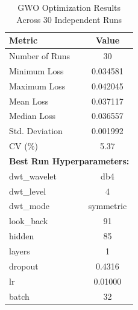 \begin{table}[htbp]
\centering
\caption{GWO Optimization Results Across 30 Independent Runs}
\label{tab:gwo_results}
\begin{tabular}{lc}
\hline
\textbf{Metric} & \textbf{Value} \\
\hline
Number of Runs & 30 \\
Minimum Loss   & 0.034581 \\
Maximum Loss   & 0.042045 \\
Mean Loss      & 0.037117 \\
Median Loss    & 0.036557 \\
Std. Deviation & 0.001992 \\
CV (\%)       & 5.37 \\
\hline
\multicolumn{2}{l}{\textbf{Best Run Hyperparameters:}} \\
dwt\_wavelet   & db4 \\
dwt\_level     & 4 \\
dwt\_mode      & symmetric \\
look\_back     & 91 \\
hidden         & 85 \\
layers         & 1 \\
dropout        & 0.4316 \\
lr             & 0.01000 \\
batch          & 32 \\
\hline
\end{tabular}
\end{table}
